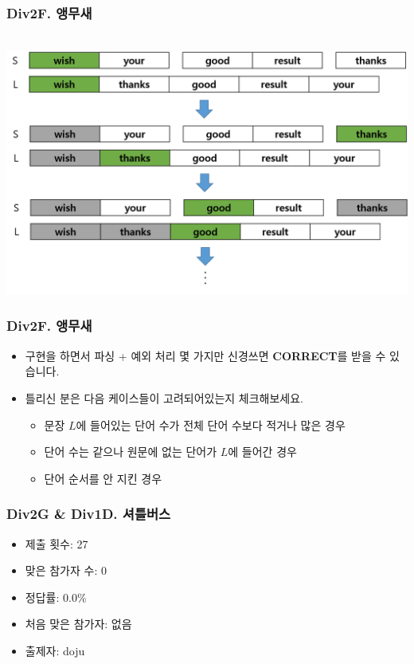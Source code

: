 \documentclass[xetex]{beamer}
\begin{document}
\begin{frame}
  \frametitle{Div2F. 앵무새}
  \begin{center}
    \includegraphics[width=1\textwidth]{parrot-sol.png}
  \end{center}
\end{frame}

\begin{frame}
  \frametitle{Div2F. 앵무새}
  \begin{itemize}
    \item 구현을 하면서 파싱 + 예외 처리 몇 가지만 신경쓰면 \textbf{CORRECT}를 받을 수 있습니다.
    \item 틀리신 분은 다음 케이스들이 고려되어있는지 체크해보세요.
    \begin{itemize}
      \item 문장 $L$에 들어있는 단어 수가 전체 단어 수보다 적거나 많은 경우
      \item 단어 수는 같으나 원문에 없는 단어가 $L$에 들어간 경우
      \item 단어 순서를 안 지킨 경우
    \end{itemize}
  \end{itemize}
\end{frame}

\begin{frame}
  \frametitle{Div2G \& Div1D. 셔틀버스}
  \begin{itemize}
    \item 제출 횟수: 27
    \item 맞은 참가자 수: 0
    \item 정답률: 0.0\%
    \item 처음 맞은 참가자: 없음
    \item 출제자: doju
  \end{itemize}
\end{frame}
\end{document}
